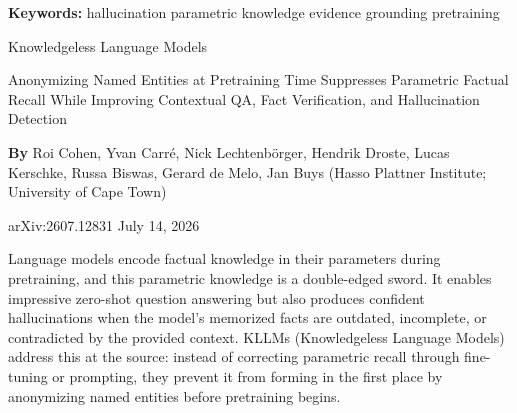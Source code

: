 \documentclass[10pt,twocolumn]{article}
\begin{document}
\setlength{\parindent}{0pt}
\setlength{\parskip}{4pt}

{\small\color{keywordgray}\textbf{Keywords:}
  hallucination \textbullet{}
  parametric knowledge \textbullet{}
  evidence grounding \textbullet{}
  pretraining}\par\vspace{4pt}

{\LARGE\bfseries\raggedright
  Knowledgeless Language Models}\par\vspace{4pt}

{\large\itshape\raggedright
  Anonymizing Named Entities at Pretraining Time Suppresses
  Parametric Factual Recall While Improving Contextual QA,
  Fact Verification, and Hallucination Detection}\par\vspace{6pt}

{\small\textbf{By} Roi Cohen, Yvan Carr\'{e}, Nick Lechtenbörger,
  Hendrik Droste, Lucas Kerschke, Russa Biswas, Gerard de Melo,
  Jan Buys (Hasso Plattner Institute; University of Cape
  Town)}\par\vspace{2pt}

{\small\color{keywordgray}arXiv:2607.12831 \textbullet{}
  July 14, 2026}
\par\vspace{2pt}\noindent{\color{rulered}\rule{\columnwidth}{0.6pt}}\vspace{6pt}

Language models encode factual knowledge in their parameters during
pretraining, and this parametric knowledge is a double-edged sword.
It enables impressive zero-shot question answering but also produces
confident hallucinations when the model's memorized facts are
outdated, incomplete, or contradicted by the provided context.
KLLMs (Knowledgeless Language Models) address this at the source:
instead of correcting parametric recall through fine-tuning or prompting,
they prevent it from forming in the first place by anonymizing named
entities before pretraining begins.
\end{document}
